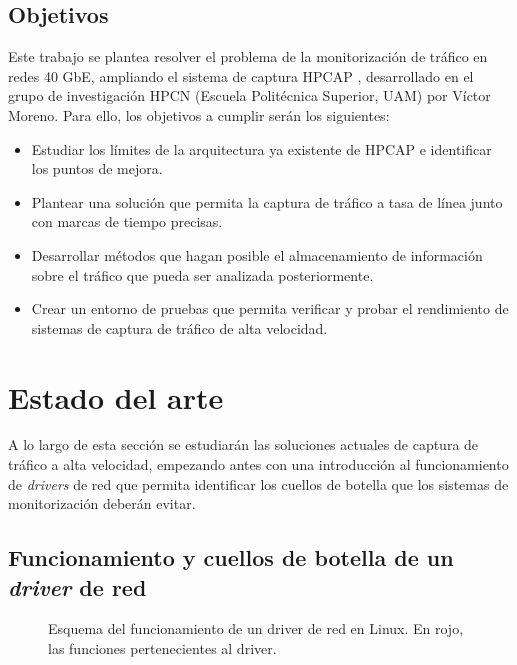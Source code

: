 \documentclass[oneside, draft]{epstfg}
\begin{document}
\section{Objetivos}

Este trabajo se plantea resolver el problema de la monitorización de tráfico en redes 40 GbE, ampliando el sistema de captura HPCAP \cite{victorPhD}, desarrollado en el grupo de investigación HPCN (Escuela Politécnica Superior, UAM) por Víctor Moreno. Para ello, los objetivos a cumplir serán los siguientes:

\begin{itemize}[itemsep=0pt]
\item Estudiar los límites de la arquitectura ya existente de HPCAP e identificar los puntos de mejora.
\item Plantear una solución que permita la captura de tráfico a tasa de línea junto con marcas de tiempo precisas.
\item Desarrollar métodos que hagan posible el almacenamiento de información sobre el tráfico que pueda ser analizada posteriormente.
\item Crear un entorno de pruebas que permita verificar y probar el rendimiento de sistemas de captura de tráfico de alta velocidad.
\end{itemize}

\chapter{Estado del arte}

A lo largo de esta sección se estudiarán las soluciones actuales de captura de tráfico a alta velocidad, empezando antes con una introducción al funcionamiento de \textit{drivers} de red que permita identificar los cuellos de botella que los sistemas de monitorización deberán evitar.

\section{Funcionamiento y cuellos de botella de un \textit{driver} de red}
\label{sec:EstadoArte:Funcionamiento}

\begin{figure}[hbtp]
\centering

\caption[Funcionamiento de un \textit{driver} de red en Linux]{Esquema del funcionamiento de un \gls{driver} de red en Linux. En rojo, las funciones pertenecientes al \gls{driver}.}
\label{fig:LinuxNetworkStack}
\end{figure}
\end{document}
